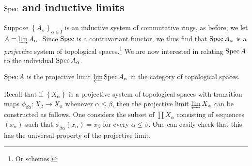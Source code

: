 
\subsection{$\operatorname{Spec}$ and inductive limits}

Suppose $\left\{A_\alpha\right\}_{\alpha\in I}$ is an inductive system of
commutative rings, as before; we let $A = \varinjlim A_\alpha$. 
Since $\operatorname{Spec}$ is a contravariant functor, we thus find that $\operatorname{Spec} A_\alpha$
is a \emph{projective} system of topological spaces.\footnote{Or schemes.}
We are now interested in relating $\operatorname{Spec} A$ to the individual $\operatorname{Spec} A_\alpha$.

\begin{proposition} 
$\operatorname{Spec} A$ is the projective limit $\varprojlim \operatorname{Spec} A_\alpha$ in the category
of topological spaces.
\end{proposition} 

Recall that if $\left\{X_\alpha\right\}$ is a projective system of topological
spaces with transition maps $\phi_{\beta \alpha}: X_\beta \to X_\alpha$ whenever $\alpha \leq
\beta$, then the projective limit $\varprojlim X_\alpha$ can be constructed as
follows. One considers the subset of $\prod X_\alpha$ consisting of sequences
$(x_\alpha)$ such that $\phi_{\beta \alpha}(x_\alpha) = x_\beta$ for every
$\alpha \leq \beta$. One can easily check that this has the universal property
of the projective limit.

